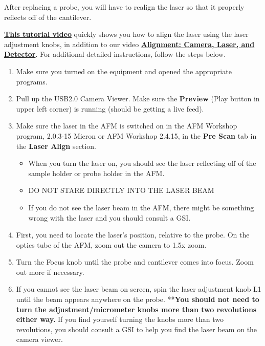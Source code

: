 \documentclass{../lab}
\begin{document}
After replacing a probe, you will have to realign the laser so that it properly reflects off of the cantilever.

\href{http://experimentationlab.berkeley.edu/sites/default/files/AFMImages/4.0\%20Laser\%20Align\%28V1.0\%29.wmv}{\textbf{This tutorial video}} quickly shows you how to align the laser using the laser adjustment knobs, in addition to our video  \href{http://experimentationlab.berkeley.edu/sites/default/files/alignment\_final2.mp4}{\textbf{Alignment: Camera, Laser, and Detector}}.  For additional detailed instructions, follow the steps below.

\begin{enumerate}
    \item Make sure you turned on the equipment and opened the appropriate programs.\textbf{  }

    \item Pull up the USB2.0 Camera Viewer. Make sure the \textbf{Preview} (Play button in upper left corner) is running (should be getting a live feed).

    \item Make sure the laser in the AFM is switched on in the AFM Workshop program, 2.0.3-15 Micron or AFM Workshop 2.4.15, in the \textbf{Pre Scan }tab in the \textbf{Laser Align }section.

    \begin{itemize}
        \item When you turn the laser on, you should see the laser reflecting off of the sample holder or probe holder in the AFM.

        \item DO NOT STARE DIRECTLY INTO THE LASER BEAM

        \item If you do not see the laser beam in the AFM, there might be something wrong with the laser and you should consult a GSI.

    \end{itemize}

    \item First, you need to locate the laser's position, relative to the probe.  On the optics tube of the AFM, zoom out the camera to 1.5x zoom.

    \item Turn the Focus knob until the probe and cantilever comes into focus.  Zoom out more if necessary.

    \item If you cannot see the laser beam on screen, spin the laser adjustment knob L1 \textbf{ }until the beam appears anywhere on the probe.  **\textbf{You should not need to turn the adjustment/micrometer knobs more than two revolutions either way.  }If you find yourself turning the knobs more than two revolutions, you should consult a GSI to help you find the laser beam on the camera viewer.


\end{enumerate}
\end{document}

